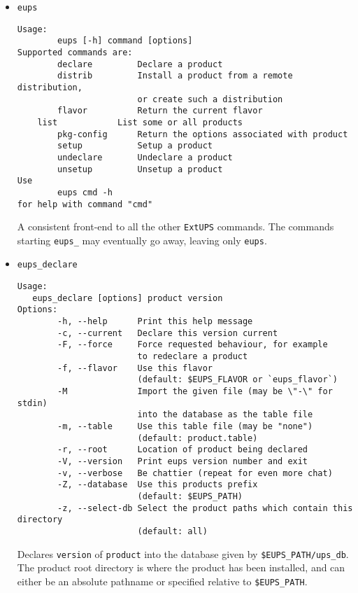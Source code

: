 \documentclass{article}
\newcommand{\code}[1]{\texttt{#1}}
\newcommand{\eups}{\code{ExtUPS}}
\begin{document}
\begin{itemize}


  \item \code{eups}
\begin{verbatim}
Usage:
        eups [-h] command [options]
Supported commands are:
        declare         Declare a product
        distrib         Install a product from a remote distribution,
                        or create such a distribution 
        flavor          Return the current flavor
	list            List some or all products
        pkg-config      Return the options associated with product
        setup           Setup a product
        undeclare       Undeclare a product
        unsetup         Unsetup a product
Use
        eups cmd -h
for help with command "cmd"
\end{verbatim}
  
A consistent front-end to all the other \eups{} commands.  The commands
starting \code{eups\_} may eventually go away, leaving only \code{eups}.


\item \code{eups\_declare}
\begin{verbatim}
Usage:
   eups_declare [options] product version
Options:
        -h, --help      Print this help message
        -c, --current   Declare this version current
        -F, --force     Force requested behaviour, for example
                        to redeclare a product
        -f, --flavor    Use this flavor
                        (default: $EUPS_FLAVOR or `eups_flavor`)
        -M              Import the given file (may be \"-\" for stdin)
                        into the database as the table file
        -m, --table     Use this table file (may be "none")
                        (default: product.table)
        -r, --root      Location of product being declared
        -V, --version   Print eups version number and exit
        -v, --verbose   Be chattier (repeat for even more chat)
        -Z, --database  Use this products prefix
                        (default: $EUPS_PATH)
        -z, --select-db Select the product paths which contain this directory 
                        (default: all)
\end{verbatim}

Declares \code{version} of \code{product} into the database given by \code{\$EUPS\_PATH/ups\_db}.
The product root directory is where the product has been installed, and can either
be an absolute pathname or specified relative to \code{\$EUPS\_PATH}.


\end{itemize}
\end{document}
